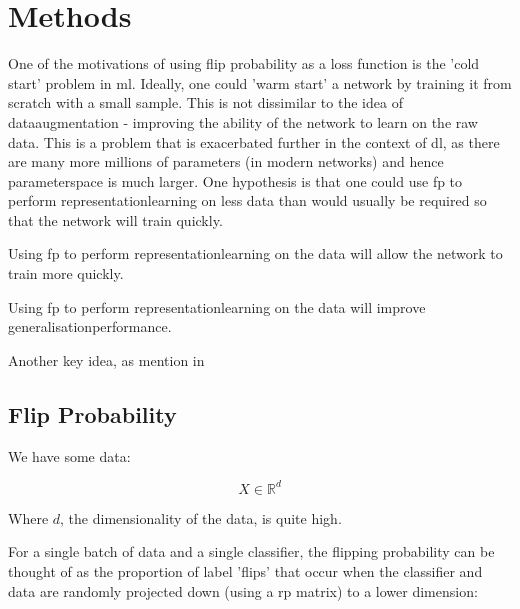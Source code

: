 \chapter{Methods}

One of the motivations of using flip probability as a loss function is the 'cold start' problem in \gls{ml}. Ideally, one could 'warm start' a network by training it from scratch with a small sample. This is not dissimilar to the idea of \gls{dataaugmentation} - improving the ability of the network to learn on the raw data. This is a problem that is exacerbated further in the context of \gls{dl}, as there are many more millions of parameters (in modern networks) and hence \gls{parameterspace} is much larger. One hypothesis is that one could use \gls{fp} to perform \gls{representationlearning} on less data than would usually be required so that the network will train quickly.

\begin{hypothesis} %
Using \gls{fp} to perform \gls{representationlearning} on the data will allow the network to train more quickly.
\label{hyp:first}
\end{hypothesis}

\begin{hypothesis} %
Using \gls{fp} to perform \gls{representationlearning} on the data will improve \gls{generalisationperformance}.
\label{hyp:second}
\end{hypothesis}

Another key idea, as mention in 

\section{Flip Probability}

We have some data:

\begin{equation}
X \in \mathds{R}^d 
\end{equation}

Where $d$, the dimensionality of the data, is quite high. \bigskip

For a single batch of data and a single classifier, the flipping probability can be thought of as the proportion of label 'flips' that occur when the classifier and data are randomly projected down (using a \gls{rp} matrix) to a lower dimension:

